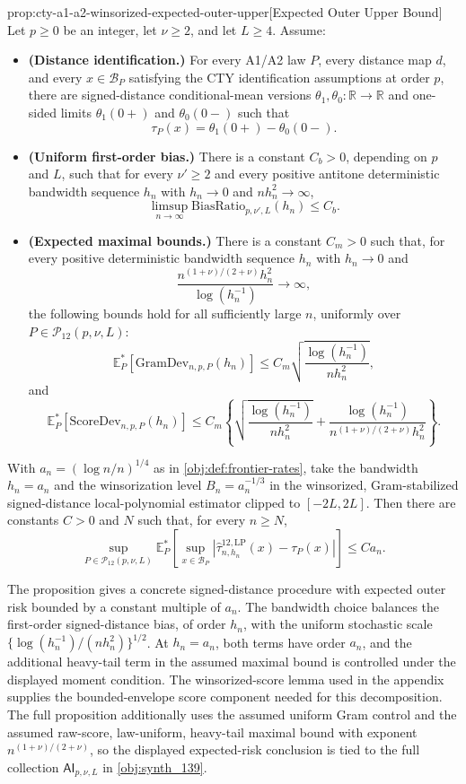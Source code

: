 \documentclass[11pt]{article}
\begin{document}
\begin{propositionv}{prop:cty-a1-a2-winsorized-expected-outer-upper}[Expected Outer Upper Bound]
Let \(p\geq 0\) be an integer, let \(\nu\geq 2\), and let \(L\geq 4\).  Assume:
\begin{itemize}
\item \textbf{(Distance identification.)}  For every A1/A2 law \(P\), every distance map \(d\), and every \(x\in\mathcal B_P\) satisfying the CTY identification assumptions at order \(p\), there are signed-distance conditional-mean versions \(\theta_1,\theta_0:\mathbb R\to\mathbb R\) and one-sided limits \(\theta_1(0+)\) and \(\theta_0(0-)\) such that
\[
\tau_P(x)=\theta_1(0+)-\theta_0(0-).
\]
\item \textbf{(Uniform first-order bias.)}  There is a constant \(C_b>0\), depending on \(p\) and \(L\), such that for every \(\nu'\geq 2\) and every positive antitone deterministic bandwidth sequence \(h_n\) with \(h_n\to0\) and \(n h_n^2\to\infty\),
\[
\limsup_{n\to\infty}
\mathrm{BiasRatio}_{p,\nu',L}(h_n)\leq C_b .
\]
\item \textbf{(Expected maximal bounds.)}  There is a constant \(C_m>0\) such that, for every positive deterministic bandwidth sequence \(h_n\) with \(h_n\to0\) and
\[
\frac{n^{(1+\nu)/(2+\nu)}h_n^2}{\log(h_n^{-1})}\to\infty,
\]
the following bounds hold for all sufficiently large \(n\), uniformly over \(P\in\mathcal P_{12}(p,\nu,L)\):
\[
\mathbb E_P^*\!\left[\mathrm{GramDev}_{n,p,P}(h_n)\right]
\leq
C_m
\sqrt{\frac{\log(h_n^{-1})}{n h_n^2}},
\]
and
\[
\mathbb E_P^*\!\left[\mathrm{ScoreDev}_{n,p,P}(h_n)\right]
\leq
C_m\left\{
\sqrt{\frac{\log(h_n^{-1})}{n h_n^2}}
+
\frac{\log(h_n^{-1})}{n^{(1+\nu)/(2+\nu)}h_n^2}
\right\}.
\]
\end{itemize}
With \(a_n=(\log n/n)^{1/4}\) as in \cref{obj:def:frontier-rates}, take the bandwidth \(h_n=a_n\) and the winsorization level \(B_n=a_n^{-1/3}\) in the winsorized, Gram-stabilized signed-distance local-polynomial estimator clipped to \([-2L,2L]\).  Then there are constants \(C>0\) and \(N\) such that, for every \(n\geq N\),
\[
\sup_{P\in\mathcal P_{12}(p,\nu,L)}
\mathbb E_P^*\!\left[
\sup_{x\in\mathcal B_P}
\left|\widehat\tau^{12,\mathrm{LP}}_{n,h_n}(x)-\tau_P(x)\right|
\right]
\leq C a_n .
\]
\end{propositionv}

The proposition gives a concrete signed-distance procedure with expected outer risk bounded by a constant multiple of \(a_n\). The bandwidth choice balances the first-order signed-distance bias, of order \(h_n\), with the uniform stochastic scale \(\{\log(h_n^{-1})/(n h_n^2)\}^{1/2}\). At \(h_n=a_n\), both terms have order \(a_n\), and the additional heavy-tail term in the assumed maximal bound is controlled under the displayed moment condition. The winsorized-score lemma used in the appendix supplies the bounded-envelope score component needed for this decomposition. The full proposition additionally uses the assumed uniform Gram control and the assumed raw-score, law-uniform, heavy-tail maximal bound with exponent \(n^{(1+\nu)/(2+\nu)}\), so the displayed expected-risk conclusion is tied to the full collection \(\mathsf{AI}_{p,\nu,L}\) in \cref{obj:synth_139}.
\end{document}
